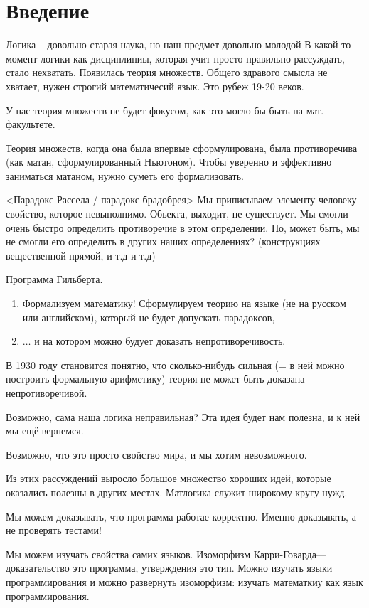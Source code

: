 \section{Введение}

Логика -- довольно старая наука, но наш предмет довольно молодой
В какой-то момент логики как дисциплиниы, которая учит просто правильно рассуждать, стало нехватать.
Появилась теория множеств.
Общего здравого смысла не хватает, нужен строгий математичесий язык. 
Это рубеж 19-20 веков.

У нас теория множеств не будет фокусом, как это могло бы быть на мат. факультете.

Теория множеств, когда она была впервые сформулирована, была противоречива (как матан, сформулированный Ньютоном).
Чтобы уверенно и эффективно заниматься матаном, нужно суметь его формализовать. 

<Парадокс Рассела / парадокс брадобрея>
Мы приписываем элементу-человеку свойство, которое невыполнимо.
Обьекта, выходит, не существует.
Мы смогли очень быстро определить противоречие в этом определении.
Но, может быть, мы не смогли его определить в других наших определениях? 
(конструкциях вещественной прямой, и т.д и т.д)

Программа Гильберта.
\begin{enumerate}
\item Формализуем математику!
Сформулируем теорию на языке (не на русском или английском), который не будет допускать парадоксов, 
\item $\ldots$ и на котором можно будует доказать непротиворечивость. 
\end{enumerate}

В 1930 году становится понятно, что сколько-нибудь сильная (= в ней можно построить формальную арифметику) теория не может быть доказана непротиворечивой.

Возможно, сама наша логика неправильная? 
Эта идея будет нам полезна, и к ней мы ещё вернемся.

Возможно, что это просто свойство мира, и мы хотим невозможного.

Из этих рассуждений выросло большое множество хороших идей, которые оказались полезны в других местах.
Матлогика служит широкому кругу нужд.

Мы можем доказывать, что программа работае корректно. 
Именно доказывать, а не проверять тестами!

Мы можем изучать свойства самих языков.
Изоморфизм Карри-Говарда--- доказательство это программа, утверждения это тип.
Можно изучать языки программирования и можно развернуть изоморфизм: изучать математкиу как язык программирования. 

